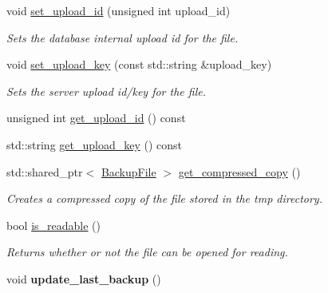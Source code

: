 \begin{DoxyCompactItemize}
void \hyperlink{class_vessel_1_1_file_1_1_backup_file_af323ffd61bf4576cafb45ab38d24a71d}{set\+\_\+upload\+\_\+id} (unsigned int upload\+\_\+id)
\begin{DoxyCompactList}\small\item\em Sets the database internal upload id for the file. \end{DoxyCompactList}\item 
\mbox{\label{class_vessel_1_1_file_1_1_backup_file_a943a0b10391929ee1dab1f2455da917e}} 
void \hyperlink{class_vessel_1_1_file_1_1_backup_file_a943a0b10391929ee1dab1f2455da917e}{set\+\_\+upload\+\_\+key} (const std\+::string \&upload\+\_\+key)
\begin{DoxyCompactList}\small\item\em Sets the server upload id/key for the file. \end{DoxyCompactList}\item 
unsigned int \hyperlink{class_vessel_1_1_file_1_1_backup_file_a9bcd229287d4aff827dde16311d7ebe1}{get\+\_\+upload\+\_\+id} () const
\item 
std\+::string \hyperlink{class_vessel_1_1_file_1_1_backup_file_a198abedc7ad1c1d101750317f607e7a1}{get\+\_\+upload\+\_\+key} () const
\item 
std\+::shared\+\_\+ptr$<$ \hyperlink{class_vessel_1_1_file_1_1_backup_file}{Backup\+File} $>$ \hyperlink{class_vessel_1_1_file_1_1_backup_file_a1ca4b7b8dbc8ea016662fdf1e58b309b}{get\+\_\+compressed\+\_\+copy} ()
\begin{DoxyCompactList}\small\item\em Creates a compressed copy of the file stored in the tmp directory. \end{DoxyCompactList}\item 
bool \hyperlink{class_vessel_1_1_file_1_1_backup_file_aca36a170c08cb07d83babdb7a0476a15}{is\+\_\+readable} ()
\begin{DoxyCompactList}\small\item\em Returns whether or not the file can be opened for reading. \end{DoxyCompactList}\item 
\mbox{\label{class_vessel_1_1_file_1_1_backup_file_a849062bf65572a4b02bd15b381b49483}} 
void {\bfseries update\+\_\+last\+\_\+backup} ()
\end{DoxyCompactItemize}

